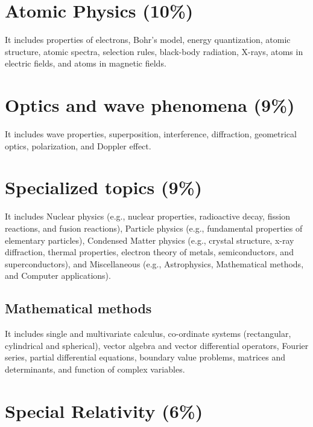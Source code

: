 \documentclass[12pt,a4paper]{article}
\begin{document}
\section{Atomic Physics (10\%)}

\quad It includes properties of electrons, Bohr's model, energy quantization, atomic structure, atomic spectra, selection rules, black-body radiation, X-rays, atoms in electric fields, and atoms in magnetic fields.


\section{Optics and wave phenomena (9\%)}

\quad It includes wave properties, superposition, interference, diffraction, geometrical optics, polarization, and Doppler effect.


\section{Specialized topics (9\%)}

\quad It includes Nuclear physics (e.g., nuclear properties, radioactive decay, fission reactions, and fusion reactions), Particle physics (e.g., fundamental properties of elementary particles), Condensed Matter physics (e.g., crystal structure, x-ray diffraction, thermal properties, electron theory of metals, semiconductors, and superconductors), and Miscellaneous (e.g., Astrophysics, Mathematical methods, and Computer applications). 

\subsection{Mathematical methods}

It includes single and multivariate calculus, co-ordinate systems (rectangular, cylindrical and spherical), vector algebra and vector differential operators, Fourier series, partial differential equations, boundary value problems, matrices and determinants, and function of complex variables.


\section{Special Relativity (6\%)}
\end{document}
